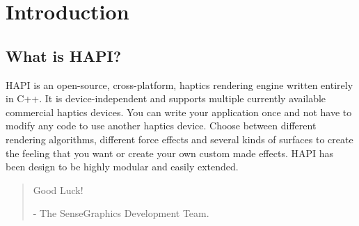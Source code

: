 
\chapter{Introduction}

\section{What is HAPI?}
HAPI is an open-source, cross-platform, haptics rendering engine written entirely in C++. It is device-independent and supports multiple currently available commercial haptics devices. You can write your application once and not have to modify any code to use another haptics device.
 Choose between different rendering algorithms, different force effects
 and several kinds of surfaces to create the feeling that you want or create your own custom made effects. HAPI has been design to be highly modular and easily extended.

\begin{quotation}
Good Luck!

- The SenseGraphics Development Team.
\end{quotation}




 


